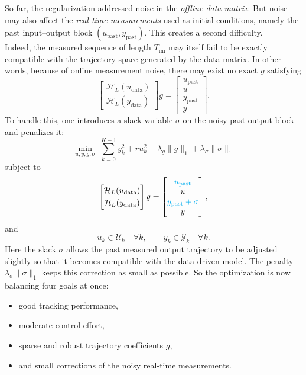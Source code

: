 So far, the regularization addressed noise in the \emph{offline data matrix}. But noise may also affect the \emph{real-time measurements} used as initial conditions, namely the past input--output block \((u_{\mathrm{past}},y_{\mathrm{past}})\). This creates a second difficulty.\\
Indeed, the measured sequence of length \(T_{\mathrm{ini}}\) may itself fail to be exactly compatible with the trajectory space generated by the data matrix. In other words, because of online measurement noise, there may exist no exact \(g\) satisfying
\[
\begin{bmatrix}
\mathcal{H}_L(u_{\mathrm{data}})\\[1mm]
\mathcal{H}_L(y_{\mathrm{data}})
\end{bmatrix}g
=
\begin{bmatrix}
u_{\mathrm{past}}\\
u\\
y_{\mathrm{past}}\\
y
\end{bmatrix}.
\]
To handle this, one introduces a slack variable \(\sigma\) on the noisy past output block and penalizes it:
\[
\min_{u,y,g,\sigma}\;\sum_{k=0}^{K-1} y_k^2 + r u_k^2 + \lambda_g \|g\|_1 + \lambda_\sigma \|\sigma\|_1
\]
subject to
\[
\begin{bmatrix}
\mathcal{H}_L(u_{\mathrm{data}})\\[1mm]
\mathcal{H}_L(y_{\mathrm{data}})
\end{bmatrix}g
=
\begin{bmatrix}
\textcolor{cyan}{u_{\mathrm{past}}}\\
u\\
\textcolor{cyan}{y_{\mathrm{past}}+\sigma}\\
y
\end{bmatrix},
\]
and
\[
u_k\in\mathcal{U}_k \quad \forall k,
\qquad
y_k\in\mathcal{Y}_k \quad \forall k.
\]
Here the slack \(\sigma\) allows the past measured output trajectory to be adjusted slightly so that it becomes compatible with the data-driven model. The penalty \(\lambda_\sigma\|\sigma\|_1\) keeps this correction as small as possible. So the optimization is now balancing four goals at once:
\begin{itemize}
    \item good tracking performance,
    \item moderate control effort,
    \item sparse and robust trajectory coefficients \(g\),
    \item and small corrections of the noisy real-time measurements.
\end{itemize}
